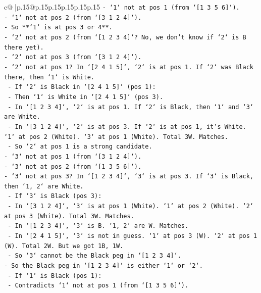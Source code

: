 \documentclass{article}
\begin{document}
{\begin{supertabular}{c@{$\;$}|p{.15\linewidth}@{}p{.15\linewidth}p{.15\linewidth}p{.15\linewidth}p{.15\linewidth}p{.15\linewidth}}
{{{\texttt{{-} `1` not at pos 1 (from `{[}1 3 5 6{]}`).} \\
\texttt{{-} `1` not at pos 2 (from `{[}3 1 2 4{]}`).} \\
\texttt{{-} So **`1` is at pos 3 or 4**.} \\
\texttt{{-} `2` not at pos 2 (from `{[}1 2 3 4{]}`? No, we don't know if `2` is B there yet).} \\
\texttt{{-} `2` not at pos 3 (from `{[}3 1 2 4{]}`).} \\
\texttt{{-} `2` not at pos 1? In `{[}2 4 1 5{]}`, `2` is at pos 1. If `2` was Black there, then `1` is White.} \\
\texttt{    {-} If `2` is Black in `{[}2 4 1 5{]}` (pos 1):} \\
\texttt{        {-} Then `1` is White in `{[}2 4 1 5{]}` (pos 3).} \\
\texttt{        {-} In `{[}1 2 3 4{]}`, `2` is at pos 1. If `2` is Black, then `1` and `3` are White.} \\
\texttt{        {-} In `{[}3 1 2 4{]}`, `2` is at pos 3. If `2` is at pos 1, it's White. `1` at pos 2 (White). `3` at pos 1 (White). Total 3W. Matches.} \\
\texttt{        {-} So `2` at pos 1 is a strong candidate.} \\
\texttt{{-} `3` not at pos 1 (from `{[}3 1 2 4{]}`).} \\
\texttt{{-} `3` not at pos 2 (from `{[}1 3 5 6{]}`).} \\
\texttt{{-} `3` not at pos 3? In `{[}1 2 3 4{]}`, `3` is at pos 3. If `3` is Black, then `1, 2` are White.} \\
\texttt{    {-} If `3` is Black (pos 3):} \\
\texttt{        {-} In `{[}3 1 2 4{]}`, `3` is at pos 1 (White). `1` at pos 2 (White). `2` at pos 3 (White). Total 3W. Matches.} \\
\texttt{        {-} In `{[}1 2 3 4{]}`, `3` is B. `1, 2` are W. Matches.} \\
\texttt{        {-} In `{[}2 4 1 5{]}`, `3` is not in guess. `1` at pos 3 (W). `2` at pos 1 (W). Total 2W. But we got 1B, 1W.} \\
\texttt{        {-} So `3` cannot be the Black peg in `{[}1 2 3 4{]}`.} \\
\texttt{{-} So the Black peg in `{[}1 2 3 4{]}` is either `1` or `2`.} \\
\texttt{    {-} If `1` is Black (pos 1):} \\
\texttt{        {-} Contradicts `1` not at pos 1 (from `{[}1 3 5 6{]}`).} \\
}}}
\end{supertabular}}
\end{document}
